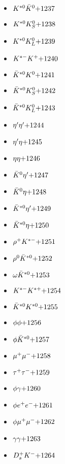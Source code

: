 \begin{multicols}{3}
\begin{itemize}
 \item $ K^{*0} \bar{K}^{0} \hfill{+1237}$
 \item $ K^{*0} K_{S}^{0} \hfill{+1238}$
 \item $ K^{*0} K_{L}^{0} \hfill{+1239}$
 \item $ K^{*-} K^{+} \hfill{+1240}$
 \item $ \bar{K}^{*0} K^{0} \hfill{+1241}$
 \item $ \bar{K}^{*0} K_{S}^{0} \hfill{+1242}$
 \item $ \bar{K}^{*0} K_{L}^{0} \hfill{+1243}$
 \item $ {\eta^{\prime}} {\eta^{\prime}} \hfill{+1244}$
 \item $ {\eta^{\prime}} \eta \hfill{+1245}$
 \item $ \eta \eta \hfill{+1246}$
 \item $ \bar{K}^{0} {\eta^{\prime}} \hfill{+1247}$
 \item $ \bar{K}^{0} \eta \hfill{+1248}$
 \item $ \bar{K}^{*0} {\eta^{\prime}} \hfill{+1249}$
 \item $ \bar{K}^{*0} \eta \hfill{+1250}$
 \item $ \rho^{+} K^{*-} \hfill{+1251}$
 \item $ \rho^{0} \bar{K}^{*0} \hfill{+1252}$
 \item $ \omega \bar{K}^{*0} \hfill{+1253}$
 \item $ K^{*-} K^{*+} \hfill{+1254}$
 \item $ \bar{K}^{*0} K^{*0} \hfill{+1255}$
 \item $ \phi \phi \hfill{+1256}$
 \item $ \phi \bar{K}^{*0} \hfill{+1257}$
 \item $ \mu^{+} \mu^{-} \hfill{+1258}$
 \item $ \tau^{+} \tau^{-} \hfill{+1259}$
 \item $ \phi \gamma \hfill{+1260}$
 \item $ \phi e^{+} e^{-} \hfill{+1261}$
 \item $ \phi \mu^{+} \mu^{-} \hfill{+1262}$
 \item $ \gamma \gamma \hfill{+1263}$
 \item $ D_{s}^{+} K^{-} \hfill{+1264}$
 \end{itemize} 
 \end{multicols} 
